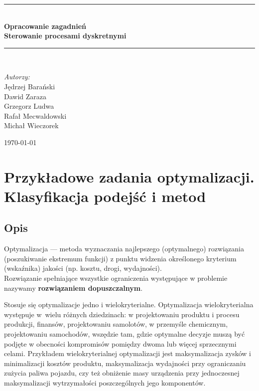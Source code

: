 \documentclass[10pt, a
4paper]{article}
\newcommand{\doctype}{Opracowanie zagadnień}
\newcommand{\projectname}{Sterowanie procesami dyskretnymi}
\newcommand{\osobaA}{J\k{e}drzej Bara\'nski}
\newcommand{\osobaB}{Dawid Zaraza}
\newcommand{\osobaC}{Grzegorz Ludwa}
\newcommand{\osobaD}{Rafał Mecwaldowski}
\newcommand{\osobaE}{Michał Wieczorek}
\begin{document}
\def\tablename{Tabela}	%

\begin{titlepage}
	\begin{center}
		\rule{\textwidth}{0.08cm}\\[0.4cm]
		{\huge \bfseries \doctype}\\[1cm]
		{\huge \bfseries \projectname}\\[0.5cm]
		\rule{\textwidth}{0.08cm}\\[1cm]
        
        \begin{flushright} \large
		\emph{Autorzy:}\\
		\osobaA\\
        \osobaB\\
        \osobaC\\
        \osobaD\\
        \osobaE\\
        [0.4cm]
		\end{flushright}

		\vfill
		
		{\large \today}
	\end{center}	
\end{titlepage}

\newpage
\tableofcontents
\newpage


\section{Przykładowe zadania optymalizacji. Klasyfikacja podejść i metod}
\subsection{Opis} 
Optymalizacja --- metoda wyznaczania najlepszego (optymalnego) rozwiązania (poszukiwanie ekstremum funkcji) z punktu widzenia określonego kryterium (wskaźnika) jakości (np. kosztu, drogi, wydajności).\\
Rozwiązanie spełniające wszystkie ograniczenia występujące w problemie nazywamy \textbf{rozwiązaniem dopuszczalnym}.

\indent Stosuje się optymalizacje jedno i wielokryterialne. Optymalizacja wielokryterialna występuje w~wielu różnych dziedzinach: w projektowaniu produktu i procesu produkcji, finansów, projektowaniu samolotów, w przemyśle chemicznym, projektowaniu samochodów, wszędzie tam, gdzie optymalne decyzje muszą być podjęte w obecności kompromisów pomiędzy dwoma lub więcej sprzecznymi celami. Przykładem wielokryterialnej optymalizacji jest maksymalizacja zysków i minimalizacji kosztów produktu, maksymalizacja wydajności przy ograniczaniu zużycia paliwa pojazdu, czy też obniżenie masy urządzenia przy jednoczesnej maksymalizacji wytrzymałości poszczególnych jego 
komponentów.\\
\end{document}
